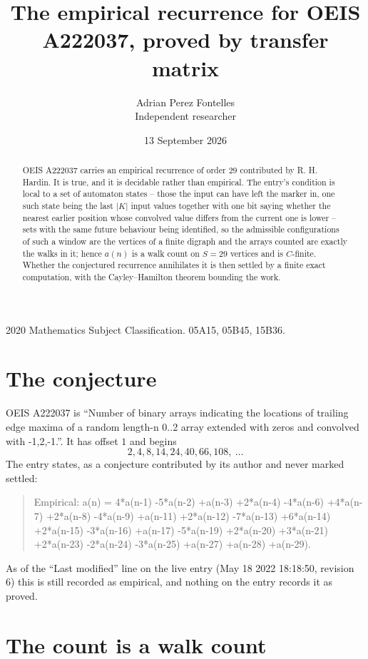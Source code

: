 \documentclass[11pt,a4paper]{article}
\title{The empirical recurrence for OEIS A222037, proved by transfer matrix}
\author{Adrian Perez Fontelles\\ \small Independent researcher}
\date{13 September 2026}
\theoremstyle{plain}
\theoremstyle{definition}
\begin{document}
\maketitle

\begin{abstract}
OEIS A222037 carries an empirical recurrence of order $29$ contributed by R. H. Hardin. It is
true, and it is decidable rather than empirical. The entry's condition is local to a set of automaton states -- those the input can have left the marker in, one such state being the last $|K|$ input values together with one bit saying whether the nearest earlier position whose convolved value differs from the current one is lower -- sets with the same future behaviour being identified, so
the admissible configurations of such a window are the vertices of a finite digraph and the
arrays counted are exactly the walks in it; hence $a(n)$ is a walk count on $S=29$ vertices
and is $C$-finite. Whether the conjectured recurrence annihilates it is then settled by a
finite exact computation, with the Cayley--Hamilton theorem bounding the work.
\end{abstract}

\noindent\small 2020 Mathematics Subject Classification. 05A15, 05B45, 15B36.\normalsize

\section{The conjecture}

OEIS A222037 is ``Number of binary arrays indicating the locations of trailing edge maxima of a random length-n 0..2 array extended with zeros and convolved with -1,2,-1.''. It has offset $1$ and begins
\[
2, 4, 8, 14, 24, 40, 66, 108,\ \dots
\]
The entry states, as a conjecture contributed by its author and never marked settled:
\begin{quote}
Empirical: a(n) = 4*a(n-1) -5*a(n-2) +a(n-3) +2*a(n-4) -4*a(n-6) +4*a(n-7) +2*a(n-8) -4*a(n-9) +a(n-11) +2*a(n-12) -7*a(n-13) +6*a(n-14) +2*a(n-15) -3*a(n-16) +a(n-17) -5*a(n-19) +2*a(n-20) +3*a(n-21) +2*a(n-23) -2*a(n-24) -3*a(n-25) +a(n-27) +a(n-28) +a(n-29).
\end{quote}
As of the ``Last modified'' line on the live entry (May 18 2022 18:18:50, revision 6) this is still
recorded as empirical, and nothing on the entry records it as proved.

\section{The count is a walk count}
\end{document}
